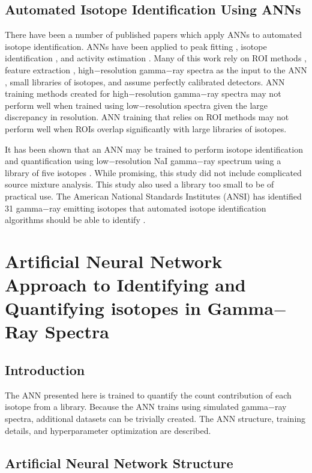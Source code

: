 \documentclass[tocnosub,noragright,centerchapter,12pt,fullpage]{uiucecethesis09}
\begin{document}
\section{Automated Isotope Identification Using ANNs}

There have been a number of published papers which apply ANNs to automated isotope identification. ANNs have been applied to peak fitting \cite{Abdel-Aal2002}, isotope identification \cite{Abdel-Aal1996, Medhat2012}, and activity estimation \cite{Abdel-Aal1996, Vigneron1996}. Many of this work rely on ROI methods \cite{Pilato1999}, feature extraction \cite{Chen2009}, high$-$resolution gamma$-$ray spectra as the input to the ANN \cite{Yoshida2002}, small libraries of isotopes, and assume perfectly calibrated detectors. ANN training methods created for high$-$resolution gamma$-$ray spectra may not perform well when trained using low$-$resolution spectra given the large discrepancy in resolution. ANN training that relies on ROI methods may not perform well when ROIs overlap significantly with large libraries of isotopes.

It has been shown that an ANN may be trained to perform isotope identification and quantification using low$-$resolution NaI gamma$-$ray spectrum using a library of five isotopes \cite{Olmos1991}. While promising, this study did not include complicated source mixture analysis. This study also used a library too small to be of practical use. The American National Standards Institutes (ANSI) has identified 31 gamma$-$ray emitting isotopes that automated isotope identification algorithms should be able to identify \cite{ANSI}.


\chapter{Artificial Neural Network Approach to Identifying and Quantifying isotopes in Gamma$-$Ray Spectra}


\section{Introduction}

The ANN presented here is trained to quantify the count contribution of each isotope from a library. Because the ANN trains using simulated gamma$-$ray spectra, additional datasets can be trivially created. The ANN structure, training details, and hyperparameter optimization are described. 


\section{Artificial Neural Network Structure}
\end{document}

